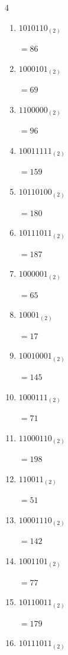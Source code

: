 \begin{multicols}{4}
\begin{enumerate}
        $=9$

  \item $1010110_{(2)}$

        $=86$

  \item $1000101_{(2)}$

        $=69$

  \item $1100000_{(2)}$

        $=96$

  \item $10011111_{(2)}$

        $=159$

  \item $10110100_{(2)}$

        $=180$

  \item $10111011_{(2)}$

        $=187$

  \item $1000001_{(2)}$

        $=65$

  \item $10001_{(2)}$

        $=17$

  \item $10010001_{(2)}$

        $=145$

  \item $1000111_{(2)}$

        $=71$

\columnbreak %

  \item $11000110_{(2)}$

        $=198$

  \item $110011_{(2)}$

        $=51$

  \item $10001110_{(2)}$

        $=142$

  \item $1001101_{(2)}$

        $=77$

  \item $10110011_{(2)}$

        $=179$

  \item $10111011_{(2)}$


\end{enumerate}
\end{multicols}
